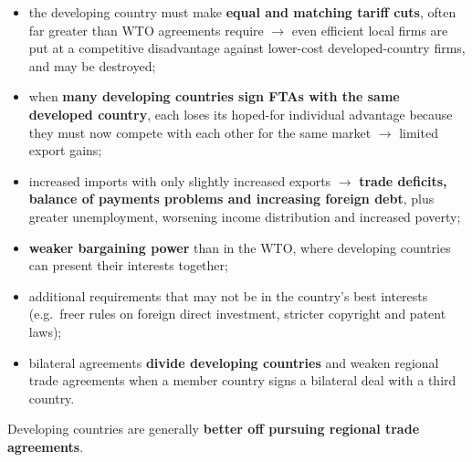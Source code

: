 \documentclass[a4paper,12pt]{article}
\begin{document}
\begin{itemize}
  \begin{itemize}
    \item the developing country must make \textbf{equal and matching tariff cuts}, often far greater than WTO agreements require $\to$ even efficient local firms are put at a competitive disadvantage against lower-cost developed-country firms, and may be destroyed;
    \item when \textbf{many developing countries sign FTAs with the same developed country}, each loses its hoped-for individual advantage because they must now compete with each other for the same market $\to$ limited export gains;
    \item increased imports with only slightly increased exports $\to$ \textbf{trade deficits, balance of payments problems and increasing foreign debt}, plus greater unemployment, worsening income distribution and increased poverty;
    \item \textbf{weaker bargaining power} than in the WTO, where developing countries can present their interests together;
    \item additional requirements that may not be in the country's best interests (e.g.\ freer rules on foreign direct investment, stricter copyright and patent laws);
    \item bilateral agreements \textbf{divide developing countries} and weaken regional trade agreements when a member country signs a bilateral deal with a third country.
  \end{itemize}
  Developing countries are generally \textbf{better off pursuing regional trade agreements}. 
\end{itemize}
\end{document}
